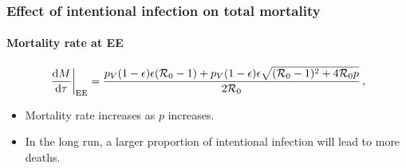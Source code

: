 \documentclass[12pt]{beamer}
\newcommand\dbyd[2]{\frac{\mathrm d{#1}}{\mathrm d{#2}}}
\newcommand{\R}{\mathcal{R}}
\newcommand{\pmV}{p_{V}}
\begin{document}
\begin{frame}
\frametitle{Effect of intentional infection on total mortality}
\framesubtitle{Mortality rate at EE}
\begin{equation}
\left. \dbyd{M}{\tau}\right|_{\rm EE}=\frac{\pmV(1-\epsilon)\epsilon(\R_0 -1)+ \pmV(1-\epsilon)\epsilon \sqrt{(\R_0-1)^2+4\R_0 p}}{2\R_0}\,,
\end{equation}
\pause
\begin{itemize}
\item Mortality rate increases as $p$ increases.
\pause
\item In the long run, a larger proportion of intentional infection will lead to more deaths.
\end{itemize}
\end{frame}
\end{document}
